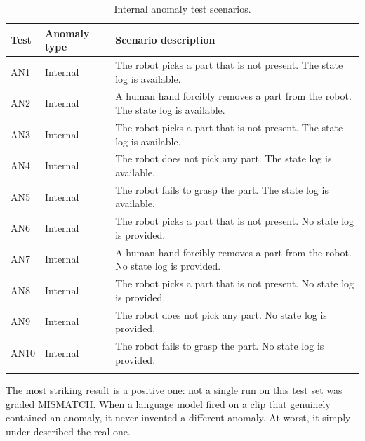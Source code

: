 \documentclass[11pt,a4paper]{article}
\begin{document}
\begin{table}[htbp]
\centering
\caption{Internal anomaly test scenarios.}
\label{tab:internal_anomaly_scenarios}
\begin{tabularx}{\textwidth}{@{}l l X@{}}
\toprule
\textbf{Test} & \textbf{Anomaly type} & \textbf{Scenario description} \\
\midrule
AN1 & Internal & The robot picks a part that is not present. The state log is available. \\
AN2 & Internal & A human hand forcibly removes a part from the robot. The state log is available. \\
AN3 & Internal & The robot picks a part that is not present. The state log is available. \\
AN4 & Internal & The robot does not pick any part. The state log is available. \\
AN5 & Internal & The robot fails to grasp the part. The state log is available. \\
AN6 & Internal & The robot picks a part that is not present. No state log is provided. \\
AN7 & Internal & A human hand forcibly removes a part from the robot. No state log is provided. \\
AN8 & Internal & The robot picks a part that is not present. No state log is provided. \\
AN9 & Internal & The robot does not pick any part. No state log is provided. \\
AN10 & Internal & The robot fails to grasp the part. No state log is provided. \\
\bottomrule
\label{tab:test2-stage3-start}
\end{tabularx}
\end{table}
\FloatBarrier

The most striking result is a positive one: not a single run on this test
set was graded MISMATCH. When a language model fired on a clip that
genuinely contained an anomaly, it never invented a different anomaly. At
worst, it simply under-described the real one.
\end{document}
